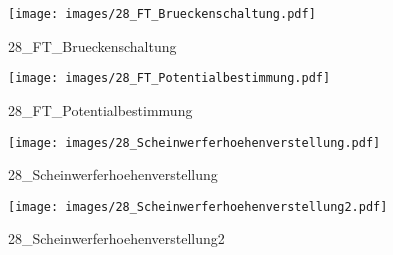 %
%
\begin{figure}[!hb]%
    \centering
  \texttt{[image: images/28\_FT\_Brueckenschaltung.pdf]}%
  \caption{28_FT_Brueckenschaltung}%
\end{figure}

%
%
\begin{figure}[!hb]%
    \centering
  \texttt{[image: images/28\_FT\_Potentialbestimmung.pdf]}%
  \caption{28_FT_Potentialbestimmung}%
\end{figure}

%
%
\begin{figure}[!hb]%
    \centering
  \texttt{[image: images/28\_Scheinwerferhoehenverstellung.pdf]}%
  \caption{28_Scheinwerferhoehenverstellung}%
\end{figure}

%
%
\begin{figure}[!hb]%
    \centering
  \texttt{[image: images/28\_Scheinwerferhoehenverstellung2.pdf]}%
  \caption{28_Scheinwerferhoehenverstellung2}%
\end{figure}

